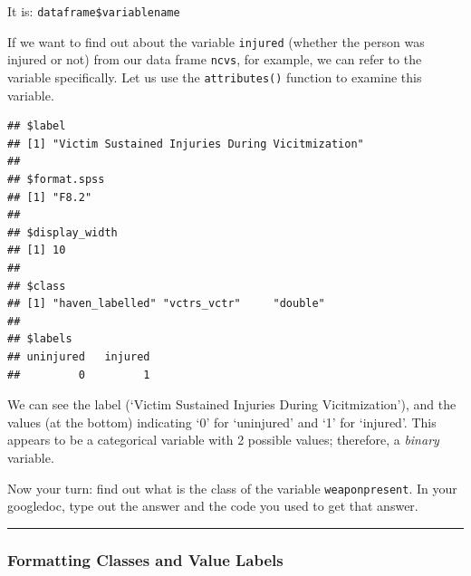 \documentclass[
]{book}
\newenvironment{Shaded}{\begin{snugshade}}{\end{snugshade}}
\newcommand{\CommentTok}[1]{\textcolor[rgb]{0.56,0.35,0.01}{\textit{#1}}}
\newcommand{\FunctionTok}[1]{\textcolor[rgb]{0.00,0.00,0.00}{#1}}
\newcommand{\NormalTok}[1]{#1}
\newcommand{\SpecialCharTok}[1]{\textcolor[rgb]{0.00,0.00,0.00}{#1}}
\begin{document}
It is: \texttt{dataframe\$variablename}

If we want to find out about the variable \texttt{injured} (whether the person was injured or not) from our data frame \texttt{ncvs}, for example, we can refer to the variable specifically. Let us use the \texttt{attributes()} function to examine this variable.

\begin{Shaded}
\end{Shaded}

\begin{verbatim}
## $label
## [1] "Victim Sustained Injuries During Vicitmization"
## 
## $format.spss
## [1] "F8.2"
## 
## $display_width
## [1] 10
## 
## $class
## [1] "haven_labelled" "vctrs_vctr"     "double"        
## 
## $labels
## uninjured   injured 
##         0         1
\end{verbatim}

\begin{Shaded}
\end{Shaded}

We can see the label (`Victim Sustained Injuries During Vicitmization'), and the values (at the bottom) indicating `0' for `uninjured' and `1' for `injured'. This appears to be a categorical variable with 2 possible values; therefore, a \emph{binary} variable.

Now your turn: find out what is the class of the variable \texttt{weaponpresent}. In your googledoc, type out the answer and the code you used to get that answer.

\begin{center}\rule{0.5\linewidth}{0.5pt}\end{center}

\hypertarget{formatting-classes-and-value-labels}{%
\subsubsection{Formatting Classes and Value Labels}\label{formatting-classes-and-value-labels}}
\end{document}
